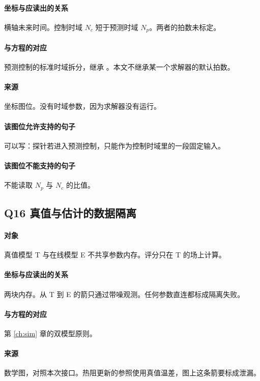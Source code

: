 \paragraph{坐标与应读出的关系}
横轴未来时间。控制时域 $N_c$ 短于预测时域 $N_p$。两者的拍数未标定。

\paragraph{与方程的对应}
预测控制的标准时域拆分，继承 \cite{rawlings2017}。本文不继承某一个求解器的默认拍数。

\paragraph{来源}
坐标图位。没有时域参数，因为求解器没有运行。

\paragraph{该图位允许支持的句子}
可以写：探针若进入预测控制，只能作为控制时域里的一段固定输入。

\paragraph{该图位不能支持的句子}
不能读取 $N_p$ 与 $N_c$ 的比值。

\subsection{Q16 真值与估计的数据隔离}
\paragraph{对象}
真值模型 T 与在线模型 E 不共享参数内存。评分只在 T 的场上计算。

\paragraph{坐标与应读出的关系}
两块内存。从 T 到 E 的箭只通过带噪观测。任何参数直连都标成隔离失败。

\paragraph{与方程的对应}
第 \ref{ch:sim} 章的双模型原则。

\paragraph{来源}
数学图，对照本次接口。热阻更新的参照使用真值温差，图上这条箭要标成泄漏。


